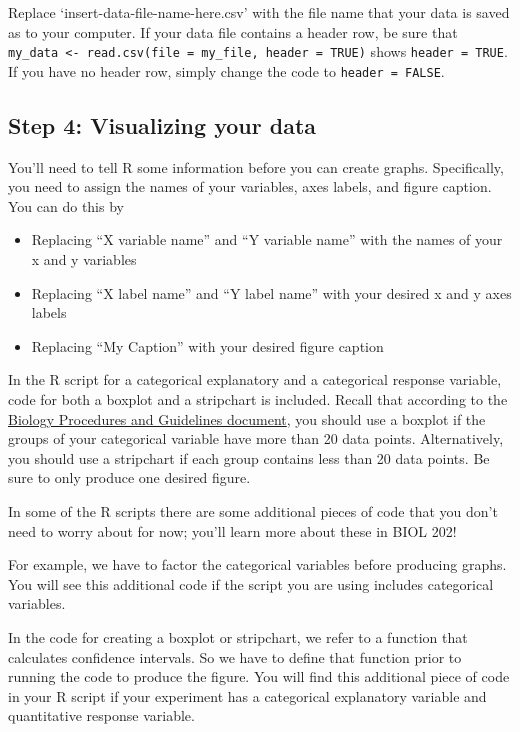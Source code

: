\documentclass[
]{book}
\providecommand{\tightlist}{%
  \setlength{\itemsep}{0pt}\setlength{\parskip}{0pt}}
\begin{document}
Replace `insert-data-file-name-here.csv' with the file name that your data is saved as to your computer. If your data file contains a header row, be sure that \texttt{my\_data\ \textless{}-\ read.csv(file\ =\ my\_file,\ header\ =\ TRUE)} shows \texttt{header\ =\ TRUE}. If you have no header row, simply change the code to \texttt{header\ =\ FALSE}.

\hypertarget{step-4-visualizing-your-data}{%
\subsection*{Step 4: Visualizing your data}\label{step-4-visualizing-your-data}}

You'll need to tell R some information before you can create graphs. Specifically, you need to assign the names of your variables, axes labels, and figure caption. You can do this by

\begin{itemize}
\tightlist
\item
  Replacing ``X variable name'' and ``Y variable name'' with the names of your x and y variables
\item
  Replacing ``X label name'' and ``Y label name'' with your desired x and y axes labels
\item
  Replacing ``My Caption'' with your desired figure caption
\end{itemize}

In the R script for a categorical explanatory and a categorical response variable, code for both a boxplot and a stripchart is included. Recall that according to the \href{https://ubco-biology.github.io/Procedures-and-Guidelines/figures.html}{Biology Procedures and Guidelines document}, you should use a boxplot if the groups of your categorical variable have more than 20 data points. Alternatively, you should use a stripchart if each group contains less than 20 data points. Be sure to only produce one desired figure.

In some of the R scripts there are some additional pieces of code that you don't need to worry about for now; you'll learn more about these in BIOL 202!

For example, we have to factor the categorical variables before producing graphs. You will see this additional code if the script you are using includes categorical variables.

In the code for creating a boxplot or stripchart, we refer to a function that calculates confidence intervals. So we have to define that function prior to running the code to produce the figure. You will find this additional piece of code in your R script if your experiment has a categorical explanatory variable and quantitative response variable.
\end{document}
